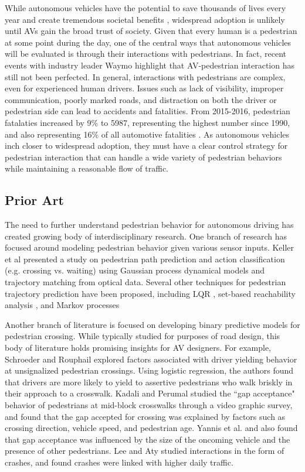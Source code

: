 \documentclass[letterpaper, 10 pt, conference]{ieeeconf}  %
\begin{document}
While autonomous vehicles have the potential to save thousands of lives every year and create tremendous societal benefits \cite{Fagnant2015}, widespread adoption is unlikely until AVs gain the broad trust of society. Given that every human is a pedestrian at some point during the day, one of the central ways that autonomous vehicles will be evaluated is through their interactions with pedestrians. In fact, recent events with industry leader Waymo highlight that AV-pedestrian interaction has still not been perfected\cite{MattRichtelandConorDougherty2015}. In general, interactions with pedestrians are complex, even for experienced human drivers. Issues such as lack of visibility, improper communication, poorly marked roads, and distraction on both the driver or pedestrian side can lead to accidents and fatalities. From 2015-2016, pedestrian fatalaties increased by 9\% to 5987, representing the highest number since 1990, and also representing 16\% of all automotive fatalities \cite{HighwayTrafficSafetyAdministration2016}. As autonomous vehicles inch closer to widespread adoption, they must have a clear control strategy for pedestrian interaction that can handle a wide variety of pedestrian behaviors while maintaining a reasonable flow of traffic.    

\subsection{Prior Art}

The need to further understand pedestrian behavior for autonomous driving has created growing body of interdisciplinary research. One branch of research has focused around modeling pedestrian behavior given various sensor inputs. Keller et al \cite{Keller2014} presented a study on pedestrian path prediction and action classification (e.g. crossing vs. waiting) using Gaussian process dynamical models and trajectory matching from optical data. Several other techniques for pedestrian trajectory prediction have been proposed, including LQR \cite{Batkovic}, set-based reachability analysis \cite{Koschi2018}, and Markov processes \cite{Karasev2016} 

Another branch of literature is focused on developing binary predictive models for pedestrian crossing. While typically studied for purposes of road design, this body of literature holds promising insights for AV designers. For example, Schroeder and Rouphail \cite{Schroeder2011} explored factors associated with driver yielding behavior at unsignalized pedestrian crossings. Using logistic regression, the authors found that drivers are more likely to yield to assertive pedestrians who walk briskly in their approach to a crosswalk. Kadali and Perumal \cite{RaghuramKadali2012} studied the ``gap acceptance" behavior of pedestrians at mid-block crosswalks through a video graphic survey, and found that the gap accepted for crossing was explained by factors such as crossing direction, vehicle speed, and pedestrian age. Yannis et al. \cite{Yannis2013} and \cite{Sun2002} also found that gap acceptance was influenced by the size of the oncoming vehicle and the presence of other pedestrians.  Lee and Aty \cite{Lee2005} studied interactions in the form of crashes, and found crashes were linked with higher daily traffic. 
\end{document}
